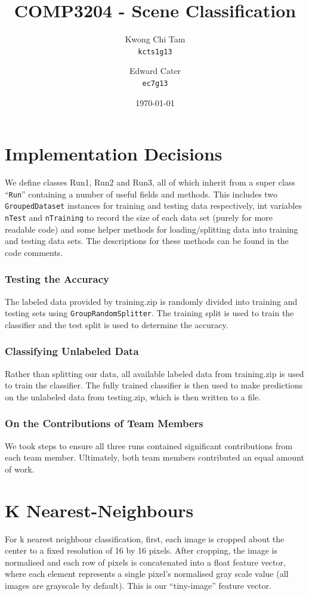 \documentclass[a4paper]{article}
\title{COMP3204 - Scene Classification}
\author{
    Kwong Chi Tam\\
    \texttt{kcts1g13}
    \and
    Edward Cater\\
    \texttt{ec7g13}  
}
\date{\today}
\begin{document}
\maketitle

\section*{Implementation Decisions}
We define classes Run1, Run2 and Run3, all of which inherit from a super class ``\texttt{Run}'' containing a number of useful fields and methods. This includes two  \texttt{GroupedDataset} instances for training and testing data respectively, int variables \texttt{nTest} and \texttt{nTraining} to record the size of each data set (purely for more readable code) and some helper methods for loading/splitting data into training and testing data sets. The descriptions for these methods can be found in the code comments.

\subsubsection*{Testing the Accuracy}
The labeled data provided by training.zip is randomly divided into training and testing sets using \texttt{GroupRandomSplitter}. The training split is used to train the classifier and the test split is used to determine the accuracy.

\subsubsection*{Classifying Unlabeled Data}
Rather than splitting our data, all available labeled data from training.zip is used to train the classifier. The fully trained classifier is then used to make predictions on the unlabeled data from testing.zip, which is then written to a file.

\subsubsection*{On the Contributions of Team Members}
We took steps to ensure all three runs contained significant contributions from each team member. Ultimately, both team members contributed an equal amount of work.

\section{K Nearest-Neighbours}
For k nearest neighbour classification, first, each image is cropped about the center to a fixed resolution of 16 by 16 pixels. After cropping, the image is normalised and each row of pixels is concatenated into a float feature vector, where each element represents a single pixel’s normalised gray scale value (all images are grayscale by default). This is our “tiny-image” feature vector.
\end{document}
